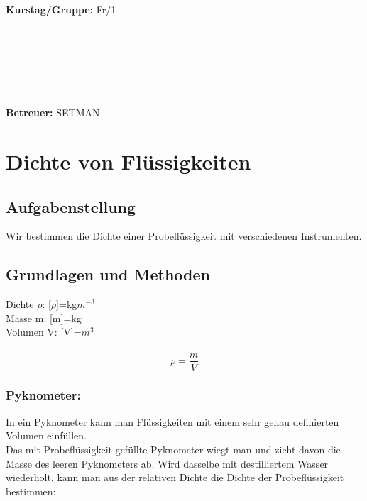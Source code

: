 \documentclass{article}
\begin{document}
\begin{verbatim}


\end{verbatim}
			\begin{flushleft}
			\textbf{\Large{Kurstag/Gruppe:}} \Large{Fr/1}
			\end{flushleft}

\begin{verbatim}






\end{verbatim}
			\begin{flushleft}
			\LARGE{\textbf{Betreuer:}}	\Large{SETMAN}	
			\end{flushleft}

\section{Dichte von Flüssigkeiten}
\subsection{Aufgabenstellung}
Wir bestimmen die Dichte einer Probeflüssigkeit mit verschiedenen Instrumenten.  


\subsection{Grundlagen und Methoden}
Dichte $\rho$: [$\rho$]=kg$m^{-3}$\\
Masse m: [m]=kg\\
Volumen V: [V]=$m^3$\\
\\
\begin{equation}
\rho = \frac{m}{V}
\end{equation}

\subsubsection*{Pyknometer:}
In ein Pyknometer kann man Flüssigkeiten mit einem sehr genau definierten Volumen einfüllen.\\
Das mit Probeflüssigkeit gefüllte Pyknometer wiegt man und zieht davon die Masse des leeren Pyknometers ab. Wird dasselbe mit destilliertem Wasser wiederholt, kann man aus der relativen Dichte die Dichte der Probeflüssigkeit bestimmen: \\
\end{document}
